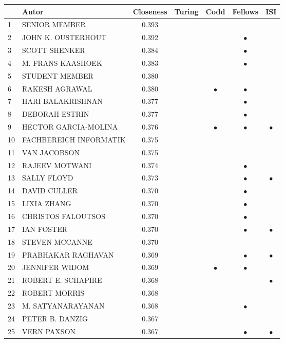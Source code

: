 \documentclass[12pt,titlepage]{report}
\begin{document}
\begin{center}
\begin{tabular}{|l|l|c|c|c|c|c|}
\hline
& {\bf Autor} & {\bf Closeness} & {\bf Turing} & {\bf Codd} & {\bf Fellows} & {\bf ISI} \\
\hline
1  & SENIOR MEMBER & 0.393          & &         &         &          \\
2  & JOHN K. OUSTERHOUT & 0.392     & &         &$\bullet$&          \\
3  & SCOTT SHENKER & 0.384          & &         &$\bullet$&          \\
4  & M. FRANS KAASHOEK & 0.383      & &         &$\bullet$&          \\
5  & STUDENT MEMBER & 0.380         & &         &         &          \\
6  & RAKESH AGRAWAL & 0.380         & &$\bullet$&$\bullet$&          \\
7  & HARI BALAKRISHNAN & 0.377      & &         &$\bullet$&          \\
8  & DEBORAH ESTRIN & 0.377         & &         &$\bullet$&          \\
9  & HECTOR GARCIA-MOLINA & 0.376   & &$\bullet$&$\bullet$&$\bullet$ \\
10 & FACHBEREICH INFORMATIK & 0.375 & &         &         &          \\
11 & VAN JACOBSON & 0.375           & &         &         &          \\
12 & RAJEEV MOTWANI & 0.374         & &         &$\bullet$&          \\
13 & SALLY FLOYD & 0.373            & &         &$\bullet$&$\bullet$ \\
14 & DAVID CULLER & 0.370           & &         &$\bullet$&          \\
15 & LIXIA ZHANG & 0.370            & &         &$\bullet$&          \\
16 & CHRISTOS FALOUTSOS & 0.370     & &         &$\bullet$&          \\
17 & IAN FOSTER & 0.370             & &         &$\bullet$&$\bullet$ \\
18 & STEVEN MCCANNE & 0.370         & &         &         &          \\
19 & PRABHAKAR RAGHAVAN & 0.369     & &         &$\bullet$&$\bullet$ \\
20 & JENNIFER WIDOM & 0.369         & &$\bullet$&$\bullet$&          \\
21 & ROBERT E. SCHAPIRE & 0.368     & &         &         &$\bullet$ \\
22 & ROBERT MORRIS & 0.368          & &         &         &          \\
23 & M. SATYANARAYANAN & 0.368      & &         &$\bullet$&          \\
24 & PETER B. DANZIG & 0.367        & &         &         &          \\
25 & VERN PAXSON & 0.367            & &         &$\bullet$&$\bullet$ \\
\hline
\end{tabular}
\end{center}
\end{document}
